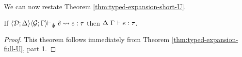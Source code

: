 We can now restate Theorem \ref{thm:typed-expansion-short-U}.
\begingroup
\def\thetheorem{\ref{thm:typed-expansion-short-U}}
\begin{theorem} \hspace{-3px}If $\expandsU{\uDD{\uD}{\Delta}\hspace{-3px}}{\uGG{\uG}{\Gamma}\hspace{-3px}}{\uPsi}{\ue}{e}{\tau}$ then $\Delta~\Gamma \vdash e : \tau$.
\end{theorem}
\begin{proof} This theorem follows immediately from Theorem \ref{thm:typed-expansion-full-U}, part 1. \end{proof}
\endgroup

